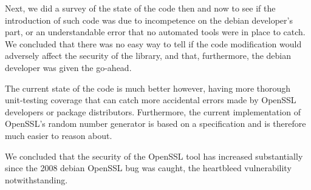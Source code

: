 \documentclass[conference]{IEEEtran}
\begin{document}
Next, we did a survey of the state of the code then and now to see if
the introduction of such code was due to incompetence on the debian
developer's part, or an understandable error that no automated tools
were in place to catch. We concluded that there was no easy way to
tell if the code modification would adversely affect the security of
the library, and that, furthermore, the debian developer was given the
go-ahead.

The current state of the code is much better however, having more
thorough unit-testing coverage that can catch more accidental errors
made by OpenSSL developers or package distributors. Furthermore, the
current implementation of OpenSSL's random number generator is based
on a specification and is therefore much easier to reason about.

We concluded that the security of the OpenSSL tool has increased
substantially since the 2008 debian OpenSSL bug was caught, the
heartbleed vulnerability notwithstanding.
    
\end{document}
